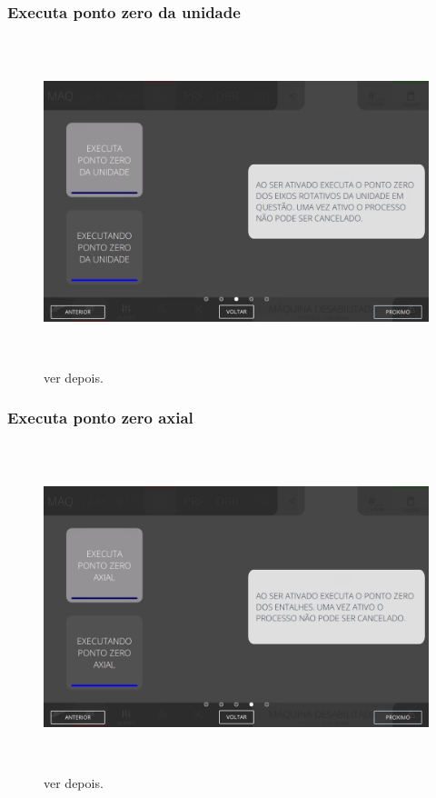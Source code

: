 \newpage
\thispagestyle{fancy}
\vspace*{\fill}
\subsubsection{\small{Executa ponto zero da unidade}}
\begin{figure}[h]
  \centering
  \includegraphics[width=576px,height=360px]{src/imagesFlexo/05-slotter/commands/e-3.png}
  \caption{ver depois.}
   \label{}
\end{figure}
\vspace*{\fill}


\newpage
\thispagestyle{fancy}
\vspace*{\fill}
\subsubsection{\small{Executa ponto zero axial}}
\begin{figure}[h]
  \centering
  \includegraphics[width=576px,height=360px]{src/imagesFlexo/05-slotter/commands/e-4.png}
  \caption{ver depois.}
   \label{}
\end{figure}
\vspace*{\fill}

